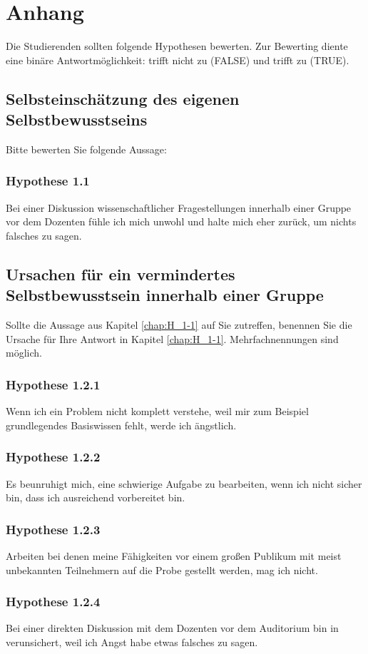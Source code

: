 \section{Anhang}
Die Studierenden sollten folgende Hypothesen bewerten. Zur Bewerting diente eine binäre Antwortmöglichkeit: trifft nicht zu (FALSE) und trifft zu (TRUE).

\subsection*{Selbsteinschätzung des eigenen Selbstbewusstseins}
Bitte bewerten Sie folgende Aussage:
\subsubsection*{Hypothese 1.1}
\label{chap:H_1-1}
Bei einer Diskussion wissenschaftlicher Fragestellungen innerhalb einer Gruppe vor dem Dozenten fühle ich mich unwohl und halte mich eher zurück, um nichts falsches zu sagen.

\subsection*{Ursachen für ein vermindertes Selbstbewusstsein innerhalb einer Gruppe}
Sollte die Aussage aus Kapitel \ref{chap:H_1-1} auf Sie zutreffen, benennen Sie die Ursache für Ihre Antwort in Kapitel \ref{chap:H_1-1}. Mehrfachnennungen sind möglich.
\subsubsection*{Hypothese 1.2.1}
Wenn ich ein Problem nicht komplett verstehe, weil mir zum Beispiel grundlegendes Basiswissen fehlt, werde ich ängstlich.
\subsubsection*{Hypothese 1.2.2}
Es beunruhigt mich, eine schwierige Aufgabe zu bearbeiten, wenn ich nicht sicher bin, dass ich ausreichend vorbereitet bin.
\subsubsection*{Hypothese 1.2.3}
Arbeiten bei denen meine Fähigkeiten vor einem großen Publikum mit meist unbekannten Teilnehmern auf die Probe gestellt werden, mag ich nicht.
\subsubsection*{Hypothese 1.2.4}
Bei einer direkten Diskussion mit dem Dozenten vor dem Auditorium bin in verunsichert, weil ich Angst habe etwas falsches zu sagen.


